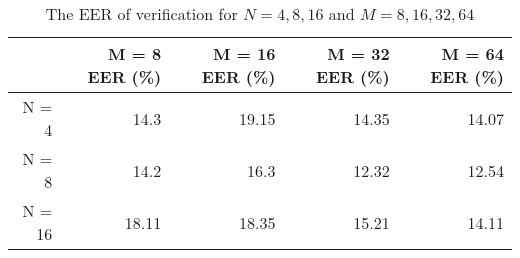 \begin{table}[htbp]
  \centering
  \caption{The EER of verification for $N=4,8,16$ and $M=8,16,32,64$}
    \begin{tabular}{|r|r|r|r|r|}
    \hline
	 & M = 8  EER (\%) & M = 16  EER (\%) & M = 32  EER (\%) & M = 64  EER (\%) \\
    \hline
    N = 4 & 14.3  & 19.15 & 14.35 & 14.07 \\ \hline
    N = 8 & 14.2  & 16.3  & 12.32 & 12.54 \\ \hline
    N = 16 & 18.11 & 18.35 & 15.21 & 14.11 \\
    \hline
    \end{tabular}%
  \label{tab:experiment:parameters}%
\end{table}%
